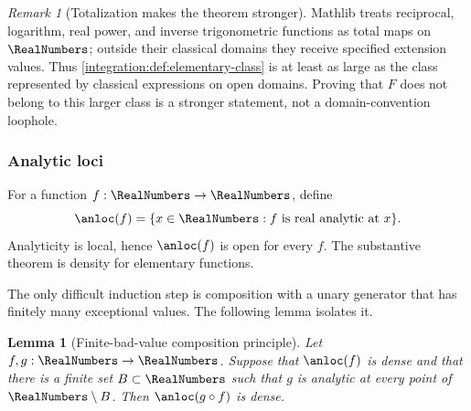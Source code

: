 \documentclass[11pt,oneside]{article}
\newtheorem{lemma}[lemma]{Lemma}
\theoremstyle{definition}
\theoremstyle{remark}
\newtheorem{remark}[remark]{Remark}
\begin{document}
\begin{remark}[Totalization makes the theorem stronger]
\label{integration:rem:elementary-totalization}
Mathlib treats reciprocal, logarithm, real power, and inverse trigonometric functions as
total maps on $\RealNumbers$; outside their classical domains they receive specified extension values.
Thus \cref{integration:def:elementary-class} is at least as large as the class represented by classical
expressions on open domains.  Proving that $F$ does not belong to this larger class is a
stronger statement, not a domain-convention loophole.
\end{remark}

\subsubsection{Analytic loci}

For a function $f:\RealNumbers\to\RealNumbers$, define
\begin{equation}
 \anloc(f)=\{x\in\RealNumbers:f\text{ is real analytic at }x\}.
 \label{integration:eq:analytic-locus}
\end{equation}
Analyticity is local, hence $\anloc(f)$ is open for every $f$.  The substantive theorem is
density for elementary functions.

The only difficult induction step is composition with a unary generator that has finitely
many exceptional values.  The following lemma isolates it.

\begin{lemma}[Finite-bad-value composition principle]
\label{integration:lem:finite-bad-composition}
Let $f,g:\RealNumbers\to\RealNumbers$.  Suppose that $\anloc(f)$ is dense and that there is a finite set
$B\subset\RealNumbers$ such that $g$ is analytic at every point of $\RealNumbers\setminus B$.  Then
$\anloc(g\circ f)$ is dense.
\end{lemma}
\end{document}
